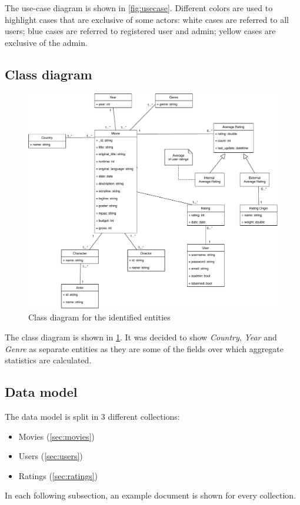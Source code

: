 \documentclass[11pt]{article}
\begin{document}
The use-case diagram is shown in \cref{fig:usecase}. Different colors are used to highlight cases that are exclusive of some actors: white cases are referred to all users; blue cases are referred to registered user and admin; yellow cases are exclusive of the admin.

\subsection{Class diagram}

\begin{figure}[h!]
    \centering
    \includegraphics[width=\textwidth]{figs/class_diagram.pdf}
    \caption{Class diagram for the identified entities}
    \label{fig:class_diagram}
\end{figure}

The class diagram is shown in \cref{fig:class_diagram}. It was decided to show \emph{Country}, \emph{Year} and \emph{Genre} as separate entities as they are some of the fields over which aggregate statistics are calculated.


\clearpage
\subsection{Data model}
The data model is split in 3 different collections:
\begin{itemize}
	\item Movies (\cref{sec:movies})
	\item Users (\cref{sec:users})
	\item Ratings (\cref{sec:ratings})
\end{itemize}
In each following subsection, an example document is shown for every collection.
\end{document}

